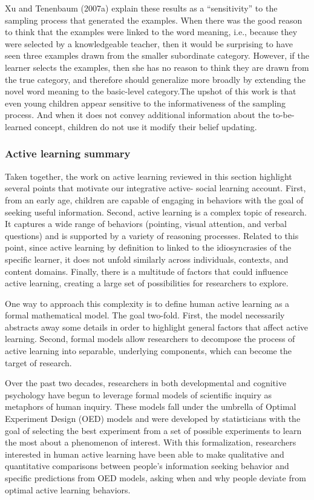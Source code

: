 \documentclass[english,floatsintext,man]{apa6}
\theoremstyle{definition}
\theoremstyle{definition}
\theoremstyle{definition}
\theoremstyle{remark}
\begin{document}
Xu and Tenenbaum (2007a) explain these results as a
\enquote{sensitivity} to the sampling process that generated the
examples. When there was the good reason to think that the examples were
linked to the word meaning, i.e., because they were selected by a
knowledgeable teacher, then it would be surprising to have seen three
examples drawn from the smaller subordinate category. However, if the
learner selects the examples, then she has no reason to think they are
drawn from the true category, and therefore should generalize more
broadly by extending the novel word meaning to the basic-level
category.The upshot of this work is that even young children appear
sensitive to the informativeness of the sampling process. And when it
does not convey additional information about the to-be-learned concept,
children do not use it modify their belief updating.

\subsubsection{Active learning summary}\label{active-learning-summary}

Taken together, the work on active learning reviewed in this section
highlight several points that motivate our integrative active- social
learning account. First, from an early age, children are capable of
engaging in behaviors with the goal of seeking useful information.
Second, active learning is a complex topic of research. It captures a
wide range of behaviors (pointing, visual attention, and verbal
questions) and is supported by a variety of reasoning processes. Related
to this point, since active learning by definition to linked to the
idiosyncrasies of the specific learner, it does not unfold similarly
across individuals, contexts, and content domains. Finally, there is a
multitude of factors that could influence active learning, creating a
large set of possibilities for researchers to explore.

One way to approach this complexity is to define human active learning
as a formal mathematical model. The goal two-fold. First, the model
necessarily abstracts away some details in order to highlight general
factors that affect active learning. Second, formal models allow
researchers to decompose the process of active learning into separable,
underlying components, which can become the target of research.

Over the past two decades, researchers in both developmental and
cognitive psychology have begun to leverage formal models of scientific
inquiry as metaphors of human inquiry. These models fall under the
umbrella of Optimal Experiment Design (OED) models and were developed by
statisticians with the goal of selecting the best experiment from a set
of possible experiments to learn the most about a phenomenon of
interest. With this formalization, researchers interested in human
active learning have been able to make qualitative and quantitative
comparisons between people's information seeking behavior and specific
predictions from OED models, asking when and why people deviate from
optimal active learning behaviors.
\end{document}
